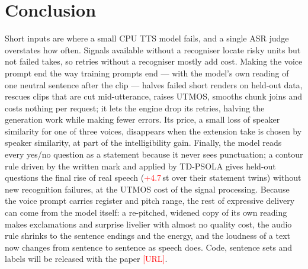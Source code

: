 \documentclass[conference]{IEEEtran}
\newcommand{\RES}[1]{\textcolor{red}{#1}}
\begin{document}
\section{Conclusion}
Short inputs are where a small CPU TTS model fails, and a single ASR judge overstates how often. Signals
available without a recogniser locate risky units but not failed takes, so retries without a recogniser
mostly add cost. Making the voice prompt end the way training prompts end --- with the model's own reading of
one neutral sentence after the clip --- halves failed short renders on held-out data, rescues clips that
are cut mid-utterance, raises UTMOS, smooths chunk joins and costs nothing per request; it lets the engine drop its retries, halving the generation work
while making fewer errors. Its price, a small loss of speaker similarity for one of three voices, disappears when the
extension take is chosen by speaker similarity, at part of the intelligibility gain. Finally, the model
reads every yes/no question as a statement because it never sees punctuation; a contour rule driven by the
written mark and applied by TD-PSOLA gives held-out questions the final rise of real speech (\RES{+4.7}\,st
over their statement twins) without new recognition failures, at the UTMOS cost of the signal processing.
Because the voice prompt carries register and pitch range, the rest of expressive delivery can come from the
model itself: a re-pitched, widened copy of its own reading makes exclamations and surprise livelier with
almost no quality cost, the audio rule shrinks to the sentence endings and the energy, and the loudness of a
text now changes from sentence to sentence as speech does.
Code,
sentence sets and labels will be released with the paper \RES{[URL]}.



\end{document}
